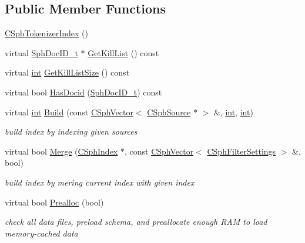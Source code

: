 \subsection*{Public Member Functions}
\begin{DoxyCompactItemize}
\item 
\hyperlink{classCSphTokenizerIndex_a9dff6c826818121f8f82395c3f72c42c}{C\-Sph\-Tokenizer\-Index} ()
\item 
virtual \hyperlink{sphinx_8h_a3176771631c12a9e4897272003e6b447}{Sph\-Doc\-I\-D\-\_\-t} $\ast$ \hyperlink{classCSphTokenizerIndex_a7e1cffc234066269d59769456f7899b3}{Get\-Kill\-List} () const 
\item 
virtual \hyperlink{sphinxexpr_8cpp_a4a26e8f9cb8b736e0c4cbf4d16de985e}{int} \hyperlink{classCSphTokenizerIndex_a6e475a5e40e804d5438d1bc6b4ddb969}{Get\-Kill\-List\-Size} () const 
\item 
virtual bool \hyperlink{classCSphTokenizerIndex_a4c8264b52e1fb6a95723f65bb59dc269}{Has\-Docid} (\hyperlink{sphinx_8h_a3176771631c12a9e4897272003e6b447}{Sph\-Doc\-I\-D\-\_\-t}) const 
\item 
virtual \hyperlink{sphinxexpr_8cpp_a4a26e8f9cb8b736e0c4cbf4d16de985e}{int} \hyperlink{classCSphTokenizerIndex_a97d8a7397223b5bc4e37dcb1f8889adb}{Build} (const \hyperlink{classCSphVector}{C\-Sph\-Vector}$<$ \hyperlink{classCSphSource}{C\-Sph\-Source} $\ast$ $>$ \&, \hyperlink{sphinxexpr_8cpp_a4a26e8f9cb8b736e0c4cbf4d16de985e}{int}, \hyperlink{sphinxexpr_8cpp_a4a26e8f9cb8b736e0c4cbf4d16de985e}{int})
\begin{DoxyCompactList}\small\item\em build index by indexing given sources \end{DoxyCompactList}\item 
virtual bool \hyperlink{classCSphTokenizerIndex_ae8438d3db942841c2175986de602c60a}{Merge} (\hyperlink{classCSphIndex}{C\-Sph\-Index} $\ast$, const \hyperlink{classCSphVector}{C\-Sph\-Vector}$<$ \hyperlink{classCSphFilterSettings}{C\-Sph\-Filter\-Settings} $>$ \&, bool)
\begin{DoxyCompactList}\small\item\em build index by mering current index with given index \end{DoxyCompactList}\item 
virtual bool \hyperlink{classCSphTokenizerIndex_a216d3d82dbc623c16a091e609188bf8a}{Prealloc} (bool)
\begin{DoxyCompactList}\small\item\em check all data files, preload schema, and preallocate enough R\-A\-M to load memory-\/cached data \end{DoxyCompactList}\item 

\end{DoxyCompactItemize}
